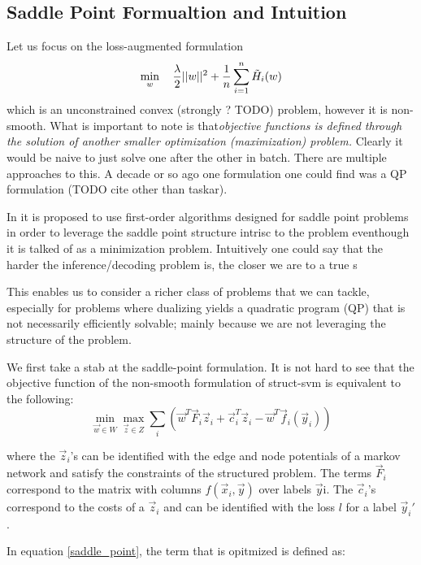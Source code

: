\subsection{Saddle Point Formualtion and Intuition}
Let us focus on the loss-augmented formulation
\begin{equation}
  \min_{w} \quad\frac{\lambda}{2}||w||^{2}+ \frac{1}{n}\sum_{i=1}^{n}\Tilde{H}_{i}(w)
\end{equation}
which is an unconstrained convex (strongly ? TODO) problem, however it is
non-smooth. What is important to note is that\emph{objective functions is
defined through the solution of another smaller optimization (maximization) problem.} Clearly
it would be naive to just solve one after the other in batch. There are multiple
approaches to this. A decade or so ago one formulation one could find was a  QP
formulation (TODO cite other than taskar).

In
\citet{taskarStructuredPredictionDual2006} it is proposed to use first-order
algorithms designed for saddle point problems in order to leverage the saddle
point structure intrisc to the problem eventhough it is talked of as a
minimization problem.  Intuitively one could say that the harder the
inference/decoding problem is, the closer we are to a true s

This enables us to consider a
richer class of problems that we can tackle, especially for problems where
dualizing yields a quadratic program (QP) that is not necessarily efficiently
solvable; mainly because we are not leveraging the structure of the problem.

We first take a stab at the saddle-point formulation. It is not hard
to see that the objective function of the non-smooth formulation of
struct-svm is equivalent to the following:
\begin{equation}
  \min_{\vec w \in {W}} \max_{\vec z \in {Z}} \sum_i \left( \vec
w^T \vec F_i \vec z_i + \vec c_i^T \vec z_i - \vec w^T \vec f_i(\vec y_i)
\right)
  \label{saddle_point}
\end{equation}

where the $\vec z_i$'s can be identified with the edge and node potentials of a
markov network and satisfy the constraints of the structured problem. The terms
$\vec F_i$ correspond to the matrix with columns $f(\vec x_i, \vec y)$ over
labels $\vec y$i. The $\vec c_i$'s correspond to the costs of a $\vec z_i$ and
can be identified with the loss $l$ for a label $\vec y_i'$.

In equation \ref{saddle_point}, the term that is opitmized is defined
as:

